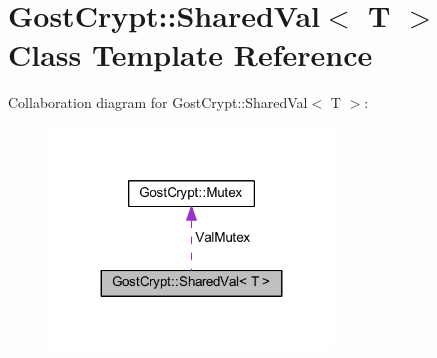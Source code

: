 \hypertarget{class_gost_crypt_1_1_shared_val}{}\section{Gost\+Crypt\+:\+:Shared\+Val$<$ T $>$ Class Template Reference}
\label{class_gost_crypt_1_1_shared_val}


Collaboration diagram for Gost\+Crypt\+:\+:Shared\+Val$<$ T $>$\+:
\nopagebreak
\begin{figure}[H]
\begin{center}
\leavevmode
\includegraphics[width=215pt]{class_gost_crypt_1_1_shared_val__coll__graph}
\end{center}
\end{figure}
